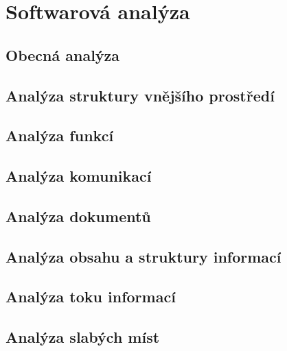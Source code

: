 \chapter{Softwarová analýza}

\section{Obecná analýza}

\section{Analýza struktury vnějšího prostředí}

\section{Analýza funkcí}

\section{Analýza komunikací}

\section{Analýza dokumentů}

\section{Analýza obsahu a struktury informací}

\section{Analýza toku informací}

\section{Analýza slabých míst}


\endinput
